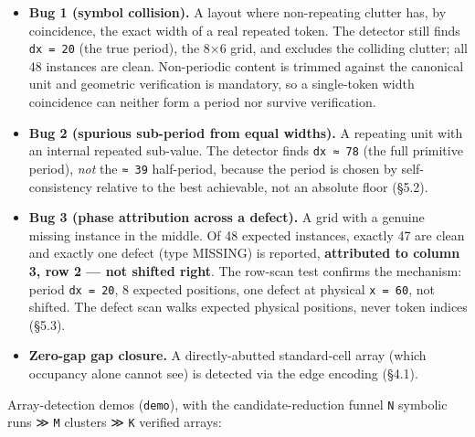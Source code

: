 \documentclass[
  11pt,
]{article}
\providecommand{\tightlist}{%
  \setlength{\itemsep}{0pt}\setlength{\parskip}{0pt}}
\begin{document}
\begin{itemize}
\tightlist
\item
  \textbf{Bug 1 (symbol collision).} A layout where non-repeating
  clutter has, by coincidence, the exact width of a real repeated token.
  The detector still finds \texttt{dx\ =\ 20} (the true period), the 8×6
  grid, and excludes the colliding clutter; all 48 instances are clean.
  Non-periodic content is trimmed against the canonical unit and
  geometric verification is mandatory, so a single-token width
  coincidence can neither form a period nor survive verification.
\item
  \textbf{Bug 2 (spurious sub-period from equal widths).} A repeating
  unit with an internal repeated sub-value. The detector finds
  \texttt{dx\ ≈\ 78} (the full primitive period), \emph{not} the
  \texttt{≈\ 39} half-period, because the period is chosen by
  self-consistency relative to the best achievable, not an absolute
  floor (§5.2).
\item
  \textbf{Bug 3 (phase attribution across a defect).} A grid with a
  genuine missing instance in the middle. Of 48 expected instances,
  exactly 47 are clean and exactly one defect (type MISSING) is
  reported, \textbf{attributed to column 3, row 2 --- not shifted
  right}. The row-scan test confirms the mechanism: period
  \texttt{dx\ =\ 20}, 8 expected positions, one defect at physical
  \texttt{x\ =\ 60}, not shifted. The defect scan walks expected
  physical positions, never token indices (§5.3).
\item
  \textbf{Zero-gap gap closure.} A directly-abutted standard-cell array
  (which occupancy alone cannot see) is detected via the edge encoding
  (§4.1).
\end{itemize}

Array-detection demos (\texttt{demo}), with the candidate-reduction
funnel \texttt{N} symbolic runs ≫ \texttt{M} clusters ≫ \texttt{K}
verified arrays:
\end{document}
